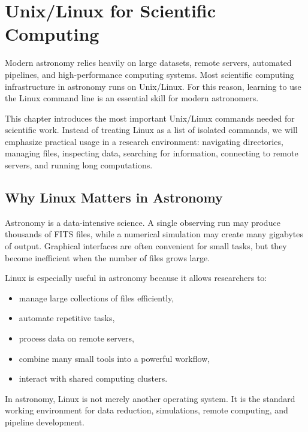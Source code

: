 \chapter{Unix/Linux for Scientific Computing}

Modern astronomy relies heavily on large datasets, remote servers,
automated pipelines, and high-performance computing systems. Most
scientific computing infrastructure in astronomy runs on Unix/Linux.
For this reason, learning to use the Linux command line is an essential
skill for modern astronomers.

This chapter introduces the most important Unix/Linux commands needed
for scientific work. Instead of treating Linux as a list of isolated
commands, we will emphasize practical usage in a research environment:
navigating directories, managing files, inspecting data, searching for
information, connecting to remote servers, and running long computations.

\section{Why Linux Matters in Astronomy}

Astronomy is a data-intensive science. A single observing run may
produce thousands of FITS files, while a numerical simulation may create
many gigabytes of output. Graphical interfaces are often convenient for
small tasks, but they become inefficient when the number of files grows
large.

Linux is especially useful in astronomy because it allows researchers to:

\begin{itemize}
\item manage large collections of files efficiently,
\item automate repetitive tasks,
\item process data on remote servers,
\item combine many small tools into a powerful workflow,
\item interact with shared computing clusters.
\end{itemize}

\begin{defbox}
In astronomy, Linux is not merely another operating system. It is the
standard working environment for data reduction, simulations, remote
computing, and pipeline development.
\end{defbox}

